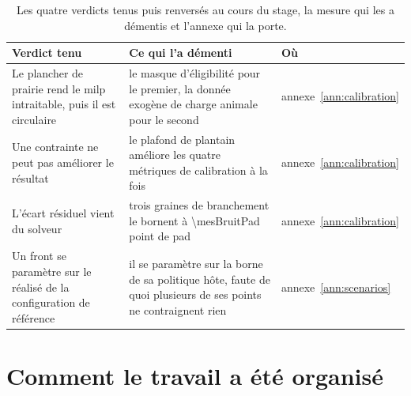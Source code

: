 \begin{table}[H]
  \centering
  \caption{Les quatre verdicts tenus puis renversés au cours du stage, la mesure qui les a
  démentis et l'annexe qui la porte.}
  \label{tab:ann-verdicts}
  \scriptsize
  \setlength{\tabcolsep}{4pt}
  \begin{tabularx}{\textwidth}{@{}>{\raggedright\arraybackslash}p{40mm}X
                               >{\raggedright\arraybackslash}p{16mm}@{}}
    \toprule
    \textbf{Verdict tenu} & \textbf{Ce qui l'a démenti} & \textbf{Où} \\
    \midrule
    Le plancher de prairie rend le \gls{milp} intraitable, puis il est circulaire &
      le masque d'éligibilité pour le premier, la donnée exogène de charge animale pour le
      second & annexe~\ref{ann:calibration} \\
    Une contrainte ne peut pas améliorer le résultat &
      le plafond de plantain améliore les quatre métriques de calibration à la fois &
      annexe~\ref{ann:calibration} \\
    L'écart résiduel vient du solveur &
      trois graines de branchement le bornent à \num{\mesBruitPad} point de \gls{pad} &
      annexe~\ref{ann:calibration} \\
    Un front se paramètre sur le réalisé de la configuration de référence &
      il se paramètre sur la borne de sa politique hôte, faute de quoi plusieurs de ses points
      ne contraignent rien & annexe~\ref{ann:scenarios} \\
    \bottomrule
  \end{tabularx}
\end{table}

\section{Comment le travail a été organisé}

